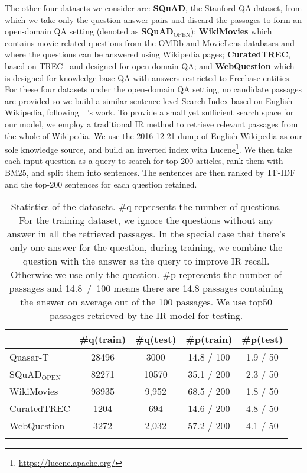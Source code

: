 \documentclass[letterpaper]{article} \usepackage{aaai18}  \usepackage{times}  \usepackage{helvet}  \usepackage{courier}  \usepackage{url}  \usepackage{graphicx}  \usepackage{comment}
\begin{document}
The other four datasets we consider are: \textbf{SQuAD}, the Stanford QA dataset, from which we take only the question-answer pairs and discard the passages to form an open-domain QA setting (denoted as \textbf{SQuAD$_{\textrm{OPEN}}$});
\textbf{WikiMovies} which contains movie-related questions from the OMDb and MovieLens databases and where the questions can be answered using Wikipedia pages; \textbf{CuratedTREC}, based on TREC~\cite{voorhees2000building} and designed for open-domain QA; and \textbf{WebQuestion} which is designed for knowledge-base QA with answers restricted to Freebase entities.
For these four datasets under the open-domain QA setting, no candidate passages are provided so we build a similar sentence-level Search Index based on English Wikipedia,
following~\citeauthor{chen2017reading}~\citeyear{chen2017reading}'s work.
To provide a small yet sufficient search space for our model, we employ a traditional IR method to retrieve relevant passages from the whole of Wikipedia. We use the 2016-12-21 dump of English Wikipedia as our sole knowledge source, and build an inverted index with Lucene\footnote{\url{https://lucene.apache.org/}}. We then take each input question as a query to search for top-200 articles, rank them with BM25, and split them into sentences.  The sentences are then ranked by TF-IDF and the top-200 sentences for each question retained.



\begin{table}[]
\centering
\small
\begin{tabular}{lcccc}
\toprule
            & \#q(train) & \#q(test)  & \#p(train) & \#p(test)\\
\midrule
Quasar-T    & 28496 & 3000  & 14.8 / 100 & 1.9 / 50 \\
SQuAD$_\text{OPEN}$       & 82271 & 10570 & 35.1 / 200 & 2.3 / 50 \\
WikiMovies  & 93935 & 9,952 & 68.5 / 200 & 1.8 / 50 \\
CuratedTREC & 1204  & 694   & 14.6 / 200 & 4.8 / 50 \\
WebQuestion & 3272  & 2,032 & 57.2 / 200 & 4.1 / 50 \\
\bottomrule
\normalsize
\end{tabular}
\caption{Statistics of the datasets. \#q represents the number of questions. For the training dataset, we ignore the questions without any answer in all the retrieved passages. In the special case that there's only one answer for the question, during training, we combine the question with the answer as the query to improve IR recall.  Otherwise we use only the question. \#p represents the number of passages and 14.8~/~100 means there are 14.8 passages containing the answer on average out of the 100 passages. We use top50 passages retrieved by the IR model for testing. }
\label{datasets}
\end{table}
\end{document}
